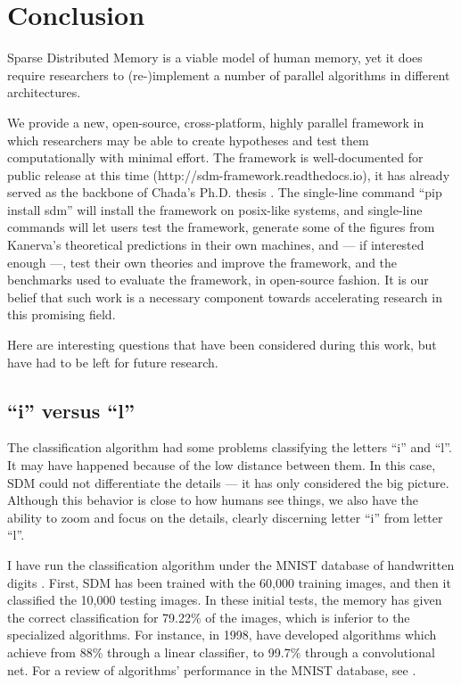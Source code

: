 \chapter{Conclusion}

Sparse Distributed Memory is a viable model of human memory, yet it does require researchers to (re-)implement a number of parallel algorithms in different architectures.

We provide a new, open-source, cross-platform, highly parallel framework in which researchers may be able to create hypotheses and test them computationally with minimal effort. The framework is well-documented for public release at this time (http://sdm-framework.readthedocs.io), it has already served as the backbone of Chada's Ph.D. thesis \citep{chada2016you}. The single-line command ``pip install sdm'' will install the framework on posix-like systems, and single-line commands will let users test the framework, generate some of the figures from Kanerva's theoretical predictions in their own machines, and --- if interested enough ---, test their own theories and improve the framework, and the benchmarks used to evaluate the framework, in open-source fashion. It is our belief that such work is a necessary component towards accelerating research in this promising field.

Here are interesting questions that have been considered during this work, but have had to be left for future research.

\section{``i'' versus ``l''}

The classification algorithm had some problems classifying the letters ``i'' and ``l''. It may have happened because of the low distance between them. In this case, SDM could not differentiate the details --- it has only considered the big picture. Although this behavior is close to how humans see things, we also have the ability to zoom and focus on the details, clearly discerning letter ``i'' from letter ``l''.

I have run the classification algorithm under the MNIST database of handwritten digits \citep{deng2012mnist}. First, SDM has been trained with the 60,000 training images, and then it classified the 10,000 testing images. In these initial tests, the memory has given the correct classification for 79.22\% of the images, which is inferior to the specialized algorithms. For instance, in 1998, \citet{lecun1998gradient} have developed algorithms which achieve from 88\% through a linear classifier, to 99.7\% through a convolutional net. For a review of algorithms' performance in the MNIST database, see \cite{mnist}.

